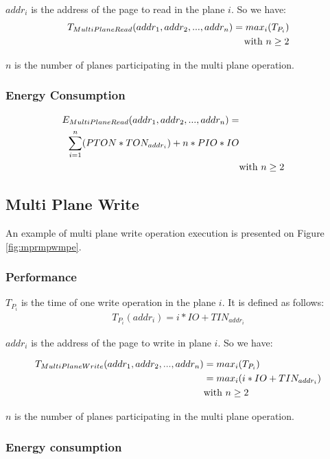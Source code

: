\documentclass[oneside]{memoir}
\begin{document}
$addr_i$ is the address of the page to read in the plane $i$. So we have:
\begin{align} T_{MultiPlaneRead}(addr_1, addr_2, ... , addr_n) = max_i(T_{P_i})
\notag\\\text{with } n \ge 2
\end{align}
  
$n$ is the number of planes participating in the multi plane operation.
  
\subsubsection{Energy Consumption}
\begin{align} E_{MultiPlaneRead}(addr_1, addr_2, ... , addr_n) = 
\notag\\\sum\limits_{i=1}^{n}(PTON*TON_{addr_i}) + n*PIO*IO 
\notag\\&\text{with } n \ge 2
\end{align}

\subsection{Multi Plane Write}

An example of multi plane write operation execution is presented on Figure \ref{fig:mprmpwmpe}.

\subsubsection{Performance}

  $T_{P_i}$ is the time of one write operation in the plane $i$. It is defined as follows:
\begin{align} T_{P_i} (addr_i) = i*IO + TIN_{addr_i} \end{align}

  $addr_i$ is the address of the page to write in plane $i$. So we have:
  
\begin{align} T_{MultiPlaneWrite}(addr_1, addr_2, ... , addr_n) &= max_i(T_{P_i})
\notag\\ &= max_i(i*IO + TIN_{addr_i})
\notag\\&\text{with } n \ge 2
\end{align}

$n$ is the number of planes participating in the multi plane operation.
  
  \subsubsection{Energy consumption}
\end{document}
